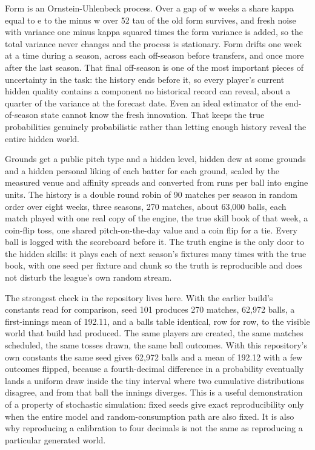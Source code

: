 \documentclass[11pt,letterpaper]{article}
\begin{document}
Form is an Ornstein-Uhlenbeck process. Over a gap of w weeks a share kappa equal to e to the minus w over 52 tau of the old form survives, and fresh noise with variance one minus kappa squared times the form variance is added, so the total variance never changes and the process is stationary. Form drifts one week at a time during a season, across each off-season before transfers, and once more after the last season. That final off-season is one of the most important pieces of uncertainty in the task: the history ends before it, so every player's current hidden quality contains a component no historical record can reveal, about a quarter of the variance at the forecast date. Even an ideal estimator of the end-of-season state cannot know the fresh innovation. That keeps the true probabilities genuinely probabilistic rather than letting enough history reveal the entire hidden world.


Grounds get a public pitch type and a hidden level, hidden dew at some grounds and a hidden personal liking of each batter for each ground, scaled by the measured venue and affinity spreads and converted from runs per ball into engine units. The history is a double round robin of 90 matches per season in random order over eight weeks, three seasons, 270 matches, about 63,000 balls, each match played with one real copy of the engine, the true skill book of that week, a coin-flip toss, one shared pitch-on-the-day value and a coin flip for a tie. Every ball is logged with the scoreboard before it. The truth engine is the only door to the hidden skills: it plays each of next season's fixtures many times with the true book, with one seed per fixture and chunk so the truth is reproducible and does not disturb the league's own random stream.


The strongest check in the repository lives here. With the earlier build's constants read for comparison, seed 101 produces 270 matches, 62,972 balls, a first-innings mean of 192.11, and a balls table identical, row for row, to the visible world that build had produced. The same players are created, the same matches scheduled, the same tosses drawn, the same ball outcomes. With this repository's own constants the same seed gives 62,972 balls and a mean of 192.12 with a few outcomes flipped, because a fourth-decimal difference in a probability eventually lands a uniform draw inside the tiny interval where two cumulative distributions disagree, and from that ball the innings diverges. This is a useful demonstration of a property of stochastic simulation: fixed seeds give exact reproducibility only when the entire model and random-consumption path are also fixed. It is also why reproducing a calibration to four decimals is not the same as reproducing a particular generated world.
\end{document}
